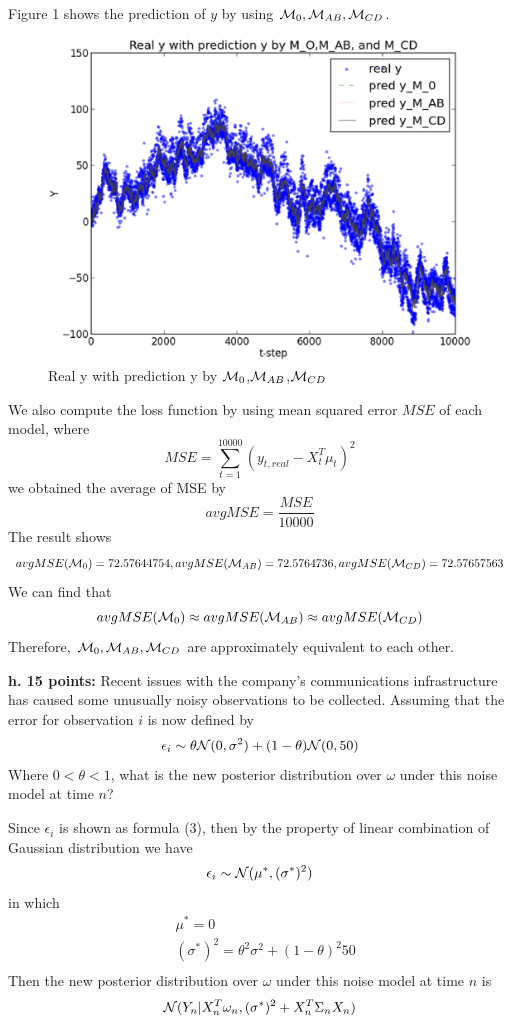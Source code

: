 \documentclass[letterpaper,10pt]{article}
\newcommand{\Mc}{{\cal M}}
\newcommand{\Nc}{{\cal N}}
\begin{document}
Figure 1 shows the prediction of $y$ by using $\Mc_0,\Mc_{AB},\Mc_{CD}$.
\begin{figure}
\centering
\includegraphics[width=12cm]{1a_graph.eps}
\caption{Real y with prediction y by $\Mc_0$,$\Mc_{AB}$,$\Mc_{CD}$}
\label{fig:aa}
\end{figure}
We also compute the loss function by using mean squared error $MSE$ of each model, where
$$
MSE=\sum^{10000}_{t=1}(y_{t,real}-X^{T}_{t}\mu_{t})^2
$$
we obtained the average of MSE by
$$
avgMSE=\frac{MSE}{10000}
$$
The result shows
$$
avgMSE(\Mc_0)=72.57644754, avgMSE(\Mc_{AB})=72.5764736, avgMSE(\Mc_{CD})=72.57657563
$$
We can find that
$$
avgMSE(\Mc_0)\approx avgMSE(\Mc_{AB}) \approx avgMSE(\Mc_{CD})
$$
Therefore, $\Mc_0,\Mc_{AB},\Mc_{CD}$ are approximately equivalent to each other.

\begin{framed}
\textbf{h. 15 points:} Recent issues with the company's communications infrastructure has caused some unusually noisy observations to be collected. Assuming that the error for observation $i$ is now defined by
\begin{equation}\label{}
\epsilon_i \sim \theta \Nc (0, \sigma^2) + (1-\theta) \Nc (0,50)
\end{equation}
Where $0<\theta<1$, what is the new posterior distribution over $\omega$ under this noise model at time $n$?
\end{framed}


Since $\epsilon_i$ is shown as formula (3), then by the property of linear combination of Gaussian distribution we have
$$
\epsilon_i \sim \Nc (\mu^{\ast}, (\sigma^{\ast})^2)
$$
in which
\begin{align*}
 & \mu^{\ast} = 0 \\
 & (\sigma^{\ast})^2 = \theta^2 \sigma^2 + (1- \theta)^2 50 \\
\end{align*}
Then the new posterior distribution over $\omega$ under this noise model at time $n$ is
$$
\Nc(Y_n | X_n^T \omega_n , (\sigma^{\ast})^2 + X_n^T \Sigma_n X_n)
$$

\clearpage
\end{document}
